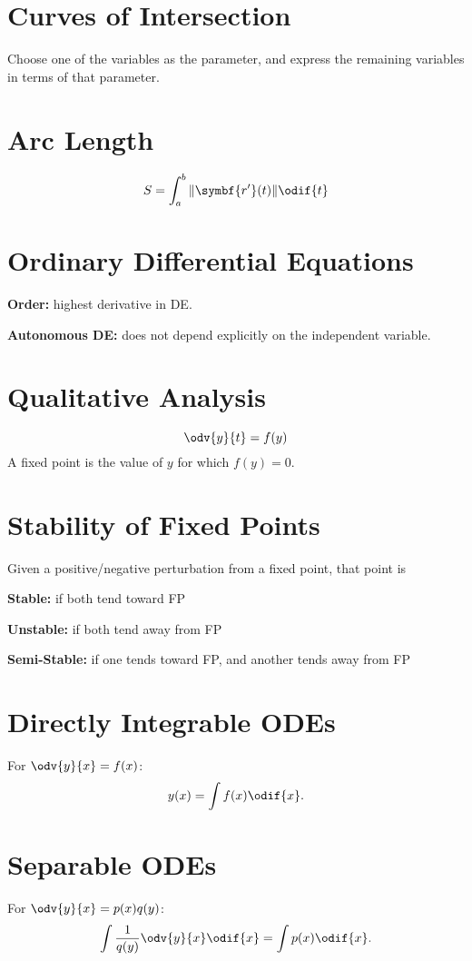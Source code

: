 \documentclass{article}
\begin{document}
\begin{multicols}{3}
    \section*{Curves of Intersection}
    Choose one of the variables as the parameter, and express the remaining variables in terms of that parameter.
    \section*{Arc Length}
    \begin{equation*}
        S = \int_a^b \norm{\symbf{r'}(t)} \odif{t}
    \end{equation*}
    \section*{Ordinary Differential Equations}
    \textbf{Order:} highest derivative in DE\@.

    \textbf{Autonomous DE:} does not depend explicitly on the independent variable.
    \section*{Qualitative Analysis}
    \begin{equation*}
        \odv{y}{t} = f(y)
    \end{equation*}
    A fixed point is the value of \(y\) for which \(f(y) = 0\).
    \section*{Stability of Fixed Points}
    Given a positive/negative perturbation from a fixed point, that point is

    \textbf{Stable:} if both tend toward FP

    \textbf{Unstable:} if both tend away from FP

    \textbf{Semi-Stable:} if one tends toward FP, and another tends away from FP
    \section*{Directly Integrable ODEs}
    For \(\odv{y}{x} = f(x)\):
    \begin{equation*}
        y(x) = \int f(x) \odif{x}.
    \end{equation*}
    \section*{Separable ODEs}
    For \(\odv{y}{x} = p(x) q(y)\):
    \begin{equation*}
        \int \frac{1}{q(y)} \odv{y}{x} \odif{x} = \int p(x) \odif{x}.
    \end{equation*}

\end{multicols}
\end{document}
